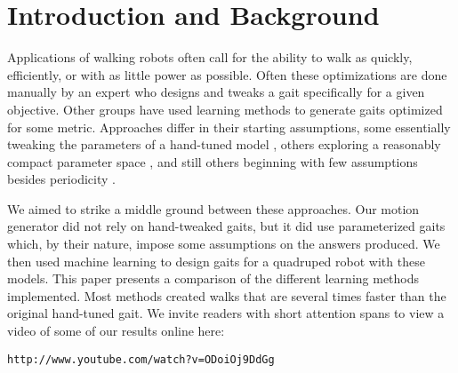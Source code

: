 \section{Introduction and Background}









Applications of walking robots often call for the ability to walk as
quickly, efficiently, or with as little power as possible.  Often
these optimizations are done manually by an expert who designs and
tweaks a gait specifically for a given objective.  Other groups have
used learning methods to generate gaits optimized for some metric.
Approaches differ in their starting assumptions, some essentially
tweaking the parameters of a hand-tuned model \cite{chernova}, others
exploring a reasonably compact parameter space \cite{kohl}, and still
others beginning with few assumptions besides periodicity
\cite{zykov}.

We aimed to strike a middle ground between these approaches.  Our
motion generator did not rely on hand-tweaked gaits, but it did use
parameterized gaits which, by their nature, impose some assumptions on
the answers produced.  We then used machine learning to design gaits
for a quadruped robot with these models.  This paper presents a
comparison of the different learning methods implemented.  Most
methods created walks that are several times faster than the original
hand-tuned gait.  We invite readers with short attention spans to view
a video of some of our results online here:

\texttt{http://www.youtube.com/watch?v=ODoiOj9DdGg}

